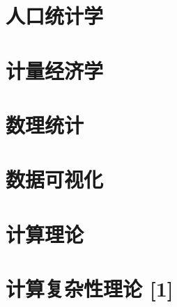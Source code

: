 \documentclass[UTF8]{NatureUniverse}
\begin{document}
\section{人口统计学}
\section{计量经济学}
\section{数理统计}
\section{数据可视化}
\section{计算理论}
\section{计算复杂性理论 [1] }
\end{document}
